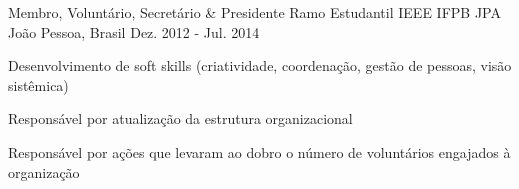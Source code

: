 \begin{cventries}

  \cventry
    {Membro, Voluntário, Secretário \& Presidente} %
    {Ramo Estudantil IEEE IFPB JPA} %
    {João Pessoa, Brasil} %
    {Dez. 2012 - Jul. 2014} %
    {
      \begin{cvitems} %
        \item{Desenvolvimento de soft skills (criatividade, coordenação, gestão de pessoas, visão sistêmica)}
        \item{Responsável por atualização da estrutura organizacional}
        \item{Responsável por ações que levaram ao dobro o número de voluntários engajados à organização}
      \end{cvitems}
    }


\end{cventries}
